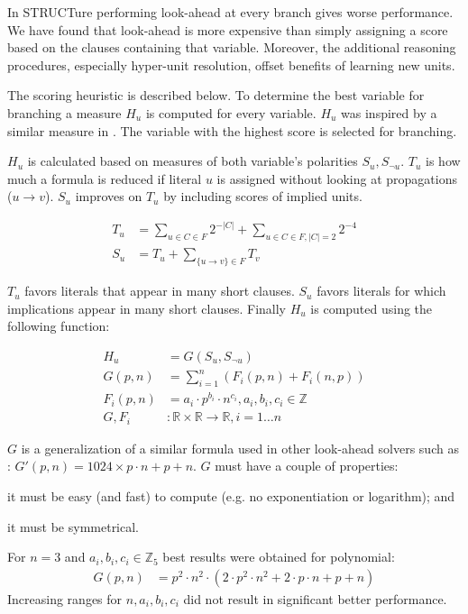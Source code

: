 In STRUCTure performing look-ahead at every branch gives worse
performance. We have found that look-ahead is more expensive than
simply assigning a score based on the clauses containing that
variable. Moreover, the additional reasoning procedures,
especially hyper-unit resolution, offset benefits of learning new units.

The scoring heuristic is described below. To determine the
best variable for branching a measure $H_u$ is computed for
every variable.  $H_u$ was inspired by a similar measure in
\cite{mine:oksolver}. The variable with the highest score is selected
for branching.

$H_u$ is calculated based on measures of both variable's polarities
$S_u, S_{\neg u}$. $T_u$ is how much a formula is reduced if literal
$u$ is assigned without looking at propagations ($u \rightarrow
v$). $S_u$ improves on $T_u$ by including scores of implied units.

\begin{align}
  T_u &= \sum_{u \in C \in F}{2^{-|C|}} + \sum_{u \in C \in F, |C| = 2}{2^{-4}} \\
  S_u &= T_u + \sum_{\{ u \rightarrow v \} \in F}{T_v}
\end{align}

$T_u$ favors literals that appear in many short clauses.  $S_u$
favors literals for which implications appear in many short clauses.
Finally $H_u$ is computed using the following function:

\begin{align}
  H_u &= G(S_u, S_{\neg u}) \\
  G(p, n) &= \sum_{i=1}^{n}{(F_i(p, n) + F_i(n, p))} \\
  F_i(p, n) &= a_i \cdot p^{b_i} \cdot n^{c_i}, a_i, b_i, c_i \in \mathbb{Z} \\
  G, F_i &: \mathbb{R} \times \mathbb{R} \rightarrow \mathbb{R}, i = 1 \ldots n
\end{align}

$G$ is a generalization of a similar formula used in other
look-ahead solvers such as \cite{mine:march}: $G'(p, n) =
1024 \times p \cdot n + p + n$. $G$ must have a couple of properties:
\begin{inparaenum}[a)]
  \item it must be easy (and fast) to compute (e.g. no exponentiation or logarithm); and
  \item it must be symmetrical.
\end{inparaenum}

For $n = 3$ and $a_i, b_i, c_i \in \mathbb{Z}_5$ best results were
obtained for polynomial:
\begin{align}
  G(p, n) &=  p^2 \cdot n^2 \cdot (2 \cdot p^2 \cdot n^2 + 2 \cdot p \cdot n + p + n)
\end{align}
Increasing ranges for $n, a_i, b_i, c_i$ did not result in
significant better performance.


